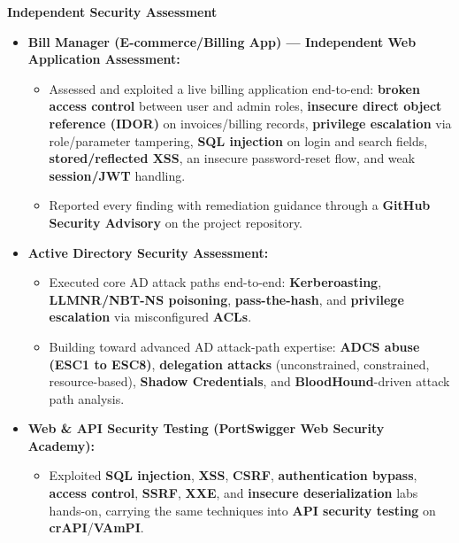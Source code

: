 \documentclass[9pt,a4paper]{extarticle}
\begin{document}
\vspace{3pt}
\noindent\textbf{Independent Security Assessment}
\begin{itemize}
  \item \textbf{Bill Manager (E-commerce/Billing App) — Independent Web Application Assessment:}
  \begin{itemize}
    \item Assessed and exploited a live billing application end-to-end: \textbf{broken access control}
          between user and admin roles, \textbf{insecure direct object reference (IDOR)} on
          invoices/billing records, \textbf{privilege escalation} via role/parameter tampering,
          \textbf{SQL injection} on login and search fields, \textbf{stored/reflected XSS}, an insecure
          password-reset flow, and weak \textbf{session/JWT} handling.
    \item Reported every finding with remediation guidance through a \textbf{GitHub Security Advisory}
          on the project repository.
  \end{itemize}

  \item \textbf{Active Directory Security Assessment:}
  \begin{itemize}
    \item Executed core AD attack paths end-to-end: \textbf{Kerberoasting}, \textbf{LLMNR/NBT-NS
          poisoning}, \textbf{pass-the-hash}, and \textbf{privilege escalation} via misconfigured \textbf{ACLs}.
    \item Building toward advanced AD attack-path expertise: \textbf{ADCS abuse (ESC1 to ESC8)},
          \textbf{delegation attacks} (unconstrained, constrained, resource-based),
          \textbf{Shadow Credentials}, and \textbf{BloodHound}-driven attack path analysis.
  \end{itemize}

  \item \textbf{Web \& API Security Testing (PortSwigger Web Security Academy):}
  \begin{itemize}
    \item Exploited \textbf{SQL injection}, \textbf{XSS}, \textbf{CSRF}, \textbf{authentication bypass},
          \textbf{access control}, \textbf{SSRF}, \textbf{XXE}, and \textbf{insecure deserialization} labs
          hands-on, carrying the same techniques into \textbf{API security testing} on \textbf{crAPI}/\textbf{VAmPI}.
  \end{itemize}
\end{itemize}
\end{document}
